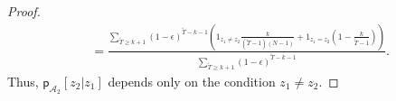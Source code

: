 \documentclass{article}
\newcommand{\sA}{\mathscr A}
\newcommand{\sC}{\mathscr C}
\newcommand{\bx}{{\mathbf x}}
\newcommand{\sfp}{{\mathsf p}}
\newcommand{\e}{\epsilon}
\begin{document}
\begin{proof}
\begin{align*}
  & = \frac{ \sum_{\tilde{T} \geq k +1 }  (1-\e)^{\tilde{T}-k-1}
  \left(1_{z_1 \neq z_2} \frac{k}{(\tilde{T}-1)(N-1)}  + 1_{z_1 = z_2} \left( 1- \frac{k}{\tilde{T}-1}\right) \right)
  }{ \sum_{\tilde{T} \geq k + 1} (1-\e)^{\tilde{T}-k-1}}.
\end{align*}
Thus, $\sfp_{\sA_2}[z_2 | z_1]$ depends only on the condition $z_1 \neq z_2$.


\end{proof}
\end{document}
